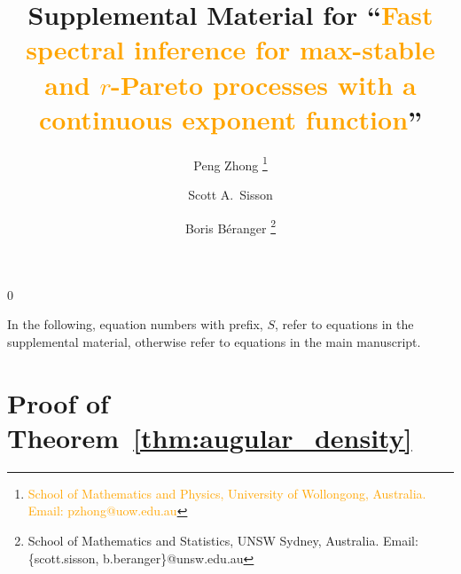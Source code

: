 \documentclass[12pt]{article}
\newcommand{\snum}{S}
\newcommand{\blind}{0}
\begin{document}
\def\spacingset#1{\renewcommand{\baselinestretch}%
{#1}\small\normalsize} \spacingset{1}

\newcommand{\PZ}{\textcolor{orange}}

\newcommand{\symfoot}[2]{%
  \begingroup
  \renewcommand{\thefootnote}{\fnsymbol{footnote}}%
  \setcounter{footnote}{#1}%
  \footnote{#2}%
  \endgroup
}
\newcommand{\symfootmark}[1]{%
  \begingroup
  \renewcommand{\thefootnote}{\fnsymbol{footnote}}%
  \setcounter{footnote}{#1}%
  \footnotemark%
  \endgroup
}

\title{\bf Supplemental Material for ``\PZ{Fast spectral inference for max-stable and $r$-Pareto processes with a continuous exponent function}''}
\blind{
  \author{Peng Zhong\symfoot{1}{\PZ{School of Mathematics and Physics, University of Wollongong, Australia. Email: pzhong@uow.edu.au}}
  \and Scott A.~Sisson\symfootmark{2}
  \and Boris B\'{e}ranger\symfoot{2}{School of Mathematics and Statistics, UNSW Sydney, Australia. Email: \{scott.sisson, b.beranger\}@unsw.edu.au}}
  \maketitle
} \fi

\baselineskip=26pt

\appendix

In the following, equation numbers with prefix, $\snum$, refer to equations in the supplemental material, otherwise refer to equations in the main manuscript.

\section{Proof of Theorem~\ref{thm:augular_density}}
\end{document}
